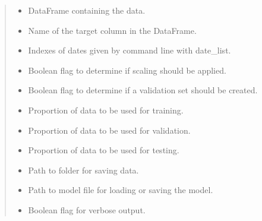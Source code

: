 \documentclass[letterpaper,10pt,english]{sphinxmanual}
\begin{document}
\begin{fulllineitems}
\begin{quote}
\begin{description}
\begin{itemize}
\item {} 
\sphinxAtStartPar
{} \textendash{} DataFrame containing the data.

\item {} 
\sphinxAtStartPar
{} \textendash{} Name of the target column in the DataFrame.

\item {} 
\sphinxAtStartPar
{} \textendash{} Indexes of dates given by command line with \textendash{}date\_list.

\item {} 
\sphinxAtStartPar
{} \textendash{} Boolean flag to determine if scaling should be applied.

\item {} 
\sphinxAtStartPar
{} \textendash{} Boolean flag to determine if a validation set should be created.

\item {} 
\sphinxAtStartPar
{} \textendash{} Proportion of data to be used for training.

\item {} 
\sphinxAtStartPar
{} \textendash{} Proportion of data to be used for validation.

\item {} 
\sphinxAtStartPar
{} \textendash{} Proportion of data to be used for testing.

\item {} 
\sphinxAtStartPar
{} \textendash{} Path to folder for saving data.

\item {} 
\sphinxAtStartPar
{} \textendash{} Path to model file for loading or saving the model.

\item {} 
\sphinxAtStartPar
{} \textendash{} Boolean flag for verbose output.

\end{itemize}

\end{description}\end{quote}


\end{fulllineitems}
\end{document}
